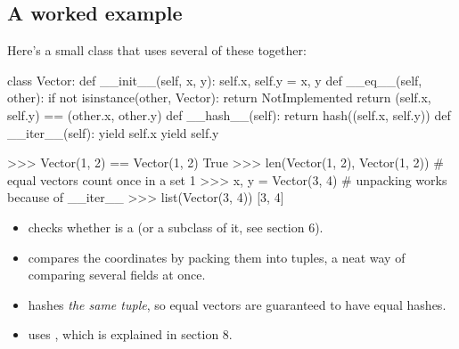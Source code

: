 \documentclass[10pt,a4paper]{article}
\begin{document}
\subsection{A worked example}
Here’s a small class that uses several of these together:
\begin{pycode}
class Vector:
    def __init__(self, x, y): self.x, self.y = x, y
    def __eq__(self, other):
        if not isinstance(other, Vector):
            return NotImplemented
        return (self.x, self.y) == (other.x, other.y)
    def __hash__(self):
        return hash((self.x, self.y))
    def __iter__(self):
        yield self.x
        yield self.y
\end{pycode}
\begin{txtcode}
>>> Vector(1, 2) == Vector(1, 2)
True
>>> len({Vector(1, 2), Vector(1, 2)})     # equal vectors count once in a set
1
>>> x, y = Vector(3, 4)                   # unpacking works because of __iter__
>>> list(Vector(3, 4))
[3, 4]
\end{txtcode}
\begin{itemize}
\item {} checks whether  is a  (or a subclass of it, see section 6).
\item {} compares the coordinates by packing them into tuples, a neat way of comparing several fields at once.
\item {} hashes \emph{the same tuple}, so equal vectors are guaranteed to have equal hashes.
\item {} uses , which is explained in section 8.
\end{itemize}
\setcounter{section}{5}
\end{document}
